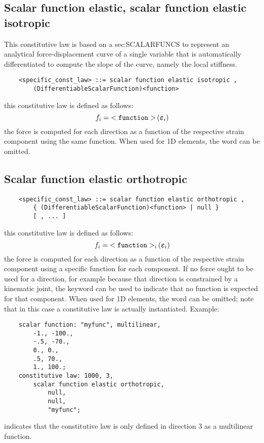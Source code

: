 \subsection{Scalar function elastic, scalar function elastic isotropic}
This constitutive law is based on a 
	{sec:SCALARFUNCS}
to represent an analytical force-displacement curve 
of a single variable that is automatically differentiated 
to compute the slope of the curve, namely the local stiffness.
\begin{verbatim}
    <specific_const_law> ::= scalar function elastic isotropic ,
        (DifferentiableScalarFunction)<function>
\end{verbatim}
this constitutive law is defined as follows:
\begin{displaymath}
	f_i = \mathtt{<function>}\left( \boldsymbol{\varepsilon}_i \right)
\end{displaymath}
the force is computed for each direction as a function of the respective
strain component using the same function.
When used for 1D elements, the word  can be omitted.

\subsection{Scalar function elastic orthotropic}
\begin{verbatim}
    <specific_const_law> ::= scalar function elastic orthotropic ,
        { (DifferentiableScalarFunction)<function> | null }
        [ , ... ]
\end{verbatim}
this constitutive law is defined as follows:
\begin{displaymath}
	f_i = \mathtt{<function>}_i\left( \boldsymbol{\varepsilon}_i \right)
\end{displaymath}
the force is computed for each direction as a function of the respective
strain component using a specific function for each component.
If no force ought to be used for a direction, for example because 
that direction is constrained by a kinematic joint, the keyword 
can be used to indicate that no function is expected for that component.
When used for 1D elements, the word  can be omitted;
note that in this case a 
constitutive law is actually instantiated.
Example:
\begin{verbatim}
    scalar function: "myfunc", multilinear,
        -1., -100.,
        -.5, -70.,
        0., 0.,
        .5, 70.,
        1., 100.;
    constitutive law: 1000, 3,
        scalar function elastic orthotropic,
            null,
            null,
            "myfunc";
\end{verbatim}
indicates that the constitutive law is only defined in direction 3 
as a multilinear function.


